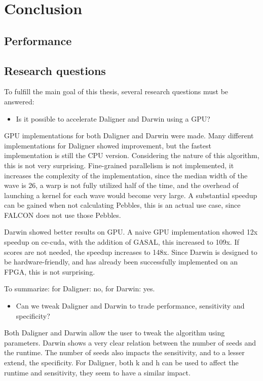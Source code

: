 \documentclass[../thesis.tex]{subfiles}
\begin{document}
\chapter{Conclusion}
\ifdefined\main
\else

\fi

\section{Performance}



\section{Research questions}
To fulfill the main goal of this thesis, several research questions must be answered:

\begin{itemize}
\item Is it possible to accelerate Daligner and Darwin using a GPU?
\end{itemize}
GPU implementations for both Daligner and Darwin were made.
Many different implementations for Daligner showed improvement, but the fastest implementation is still the CPU version.
Considering the nature of this algorithm, this is not very surprising.
Fine-grained parallelism is not implemented, it increases the complexity of the implementation, since the median width of the wave is 26, a warp is not fully utilized half of the time, and the overhead of launching a kernel for each wave would become very large.
A substantial speedup can be gained when not calculating Pebbles, this is an actual use case, since FALCON does not use those Pebbles.

Darwin showed better results on GPU.
A naive GPU implementation showed 12x speedup on ce-cuda, with the addition of GASAL, this increased to 109x.
If scores are not needed, the speedup increases to 148x.
Since Darwin is designed to be hardware-friendly, and has already been successfully implemented on an FPGA, this is not surprising.

To summarize: for Daligner: no, for Darwin: yes.


\begin{itemize}
\item Can we tweak Daligner and Darwin to trade performance, sensitivity and specificity?
\end{itemize}
Both Daligner and Darwin allow the user to tweak the algorithm using parameters.
Darwin shows a very clear relation between the number of seeds and the runtime.
The number of seeds also impacts the sensitivity, and to a lesser extend, the specificity.
For Daligner, both k and h can be used to affect the runtime and sensitivity, they seem to have a similar impact.
\end{document}
